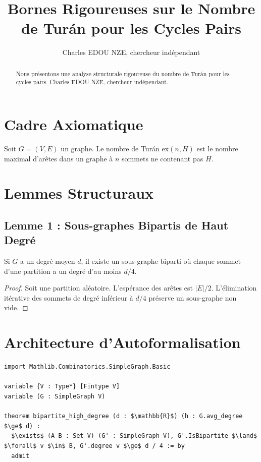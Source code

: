 \documentclass[11pt,a4paper]{article}
\title{Bornes Rigoureuses sur le Nombre de Tur\'an pour les Cycles Pairs}
\author{Charles EDOU NZE, chercheur ind\'ependant}
\date{}
\begin{document}
\maketitle

\begin{abstract}
Nous pr\'esentons une analyse structurale rigoureuse du nombre de Tur\'an pour les cycles pairs. Charles EDOU NZE, chercheur ind\'ependant.
\end{abstract}

\section{Cadre Axiomatique}
Soit $G = (V, E)$ un graphe. Le nombre de Tur\'an $\mathrm{ex}(n, H)$ est le nombre maximal d'ar\^etes dans un graphe \`a $n$ sommets ne contenant pas $H$.

\section{Lemmes Structuraux}
\subsection{Lemme 1 : Sous-graphes Bipartis de Haut Degr\'e}
Si $G$ a un degr\'e moyen $d$, il existe un sous-graphe biparti o\`u chaque sommet d'une partition a un degr\'e d'au moins $d/4$.
\begin{proof}
Soit une partition al\'eatoire. L'esp\'erance des ar\^etes est $|E|/2$. L'\'elimination it\'erative des sommets de degr\'e inf\'erieur \`a $d/4$ pr\'eserve un sous-graphe non vide.
\end{proof}

\section{Architecture d'Autoformalisation}
\begin{lstlisting}[basicstyle=\ttfamily\small, breaklines=true, mathescape=true]
import Mathlib.Combinatorics.SimpleGraph.Basic

variable {V : Type*} [Fintype V]
variable (G : SimpleGraph V)

theorem bipartite_high_degree (d : $\mathbb{R}$) (h : G.avg_degree $\ge$ d) :
  $\exists$ (A B : Set V) (G' : SimpleGraph V), G'.IsBipartite $\land$ $\forall$ v $\in$ B, G'.degree v $\ge$ d / 4 := by
  admit
\end{lstlisting}
\end{document}
